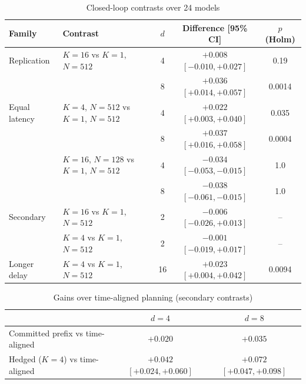 \documentclass[aps,physrev,\manuscriptlayout,superscriptaddress,
  longbibliography,amsmath,amssymb]{revtex4-2}
\begin{document}
\begin{table}[t]
\centering
\caption{Closed-loop contrasts over 24 models}\label{tab:contrasts}
\begin{tabular*}{\textwidth}{@{\extracolsep\fill}llccc}
\toprule
Family & Contrast & $d$ & Difference [95\% CI] & $p$ (Holm) \\
\midrule
Replication & $K=16$ vs $K=1$, $N=512$ & 4 & $+0.008$ $[-0.010, +0.027]$ & 0.19 \\
 & & 8 & $+0.036$ $[+0.014, +0.057]$ & 0.0014 \\
Equal latency & $K=4$, $N=512$ vs $K=1$, $N=512$ & 4 & $+0.022$ $[+0.003, +0.040]$ & 0.035 \\
 & & 8 & $+0.037$ $[+0.016, +0.058]$ & 0.0004 \\
 & $K=16$, $N=128$ vs $K=1$, $N=512$ & 4 & $-0.034$ $[-0.053, -0.015]$ & 1.0 \\
 & & 8 & $-0.038$ $[-0.061, -0.015]$ & 1.0 \\
Secondary & $K=16$ vs $K=1$, $N=512$ & 2 & $-0.006$ $[-0.026, +0.013]$ & -- \\
 & $K=4$ vs $K=1$, $N=512$ & 2 & $-0.001$ $[-0.019, +0.017]$ & -- \\
Longer delay & $K=4$ vs $K=1$, $N=512$ & 16 & $+0.023$ $[+0.004, +0.042]$ & 0.0094 \\
\bottomrule
\end{tabular*}

\par{}
\end{table}

\begin{table}[t]
\centering
\caption{Gains over time-aligned planning (secondary contrasts)}\label{tab:timealigned}
\begin{tabular*}{\textwidth}{@{\extracolsep\fill}lcc@{}}
\toprule
 & $d=4$ & $d=8$ \\
\midrule
Committed prefix vs time-aligned & $+0.020$ & $+0.035$ \\
Hedged ($K=4$) vs time-aligned & $+0.042$ $[+0.024, +0.060]$ & $+0.072$ $[+0.047, +0.098]$ \\
\bottomrule
\end{tabular*}

\par{}
\end{table}
\end{document}
